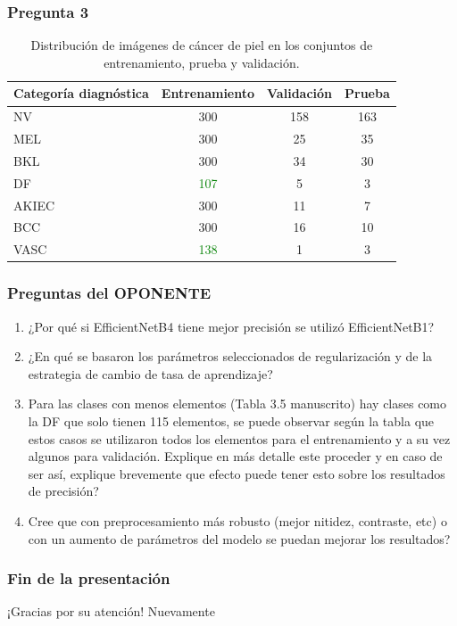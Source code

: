 \documentclass{beamer}
\begin{document}
\begin{frame}
  \frametitle{Pregunta 3}

  \begin{table}[H]
    \small
    \centering
    \begin{tabular}{lccc}
    \hline
    \textbf{Categoría diagnóstica} & \textbf{Entrenamiento} & \textbf{Validación} & \textbf{Prueba} \\
    \hline
    NV       & 300 & 158 & 163 \\
    MEL      & 300 & 25  & 35  \\
    BKL      & 300 & 34  & 30  \\
    DF       & \textcolor{green}{107} & 5   & 3   \\
    AKIEC    & 300 & 11  & 7   \\
    BCC      & 300 & 16  & 10  \\
    VASC     & \textcolor{green}{138} & 1   & 3   \\ \hline
    \end{tabular}
    \caption{Distribución de imágenes de cáncer de piel en los conjuntos de entrenamiento, prueba y validación.}
    \label{table:train_test_validate_e1}
    \end{table}
\end{frame}

\begin{frame}
  \frametitle{Preguntas del OPONENTE}

      \begin{enumerate}
        \item<0-> ¿Por qué si EfficientNetB4 tiene mejor precisión se utilizó EfficientNetB1?
        \item<0-> ¿En qué se basaron los parámetros seleccionados de regularización y de la estrategia de cambio de tasa de aprendizaje?
        \item<0-> Para las clases con menos elementos (Tabla 3.5 manuscrito) hay clases como la DF que solo tienen 115 elementos, se puede observar según la tabla que estos casos se utilizaron todos los elementos para el entrenamiento y a su vez algunos para validación. Explique en más detalle este proceder  y en caso de ser así, explique brevemente que efecto puede tener esto sobre los resultados de precisión?
        \item<0-> Cree que con preprocesamiento más robusto (mejor nitidez, contraste, etc) o con un aumento de parámetros del modelo se puedan mejorar los resultados?
      \end{enumerate}
\end{frame}

\begin{frame}
  \frametitle{Fin de la presentación}
  \begin{center}
    \Huge{¡Gracias por su atención!}
    Nuevamente
  \end{center}
\end{frame}
\end{document}
